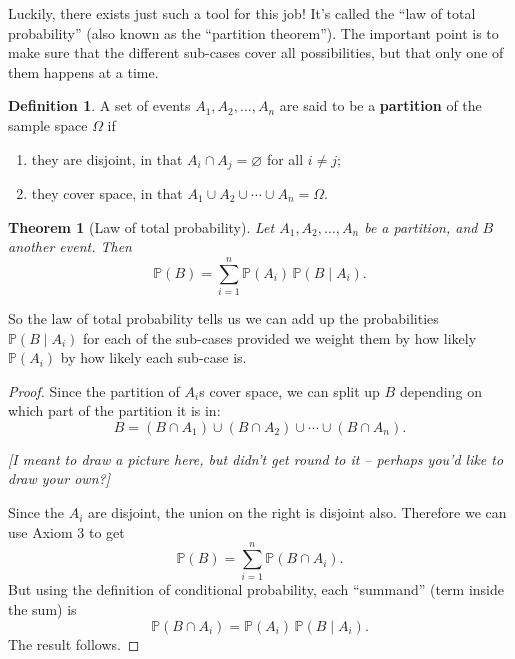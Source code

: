\documentclass[
  a4paper,
]{book}
\providecommand{\tightlist}{%
  \setlength{\itemsep}{0pt}\setlength{\parskip}{0pt}}
\newtheorem{theorem}{Theorem}[chapter]
\theoremstyle{definition}
\newtheorem{definition}{Definition}[chapter]
\theoremstyle{definition}
\theoremstyle{definition}
\theoremstyle{definition}
\theoremstyle{remark}
\begin{document}
Luckily, there exists just such a tool for this job! It's called the ``law of total probability'' (also known as the ``partition theorem''). The important point is to make sure that the different sub-cases cover all possibilities, but that only one of them happens at a time.

\begin{definition}

A set of events \(A_1, A_2, \dots, A_n\) are said to be a \textbf{partition} of the sample space \(\Omega\) if

\begin{enumerate}
\def\labelenumi{\arabic{enumi}.}
\tightlist
\item
  they are disjoint, in that \(A_i \cap A_j = \varnothing\) for all \(i \neq j\);
\item
  they cover space, in that \(A_1 \cup A_2 \cup \cdots \cup A_n = \Omega\).
\end{enumerate}

\end{definition}

\begin{theorem}[Law of total probability]
\protect\hypertarget{thm:thlawtotal}{}\label{thm:thlawtotal}Let \(A_1, A_2, \dots, A_n\) be a partition, and \(B\) another event. Then
\[ \mathbb P(B) = \sum_{i=1}^n \mathbb P(A_i) \, \mathbb P(B \mid A_i) . \]
\end{theorem}

So the law of total probability tells us we can add up the probabilities \(\mathbb P(B \mid A_i)\) for each of the sub-cases provided we weight them by how likely \(\mathbb P(A_i)\) by how likely each sub-case is.

\begin{proof}
Since the partition of \(A_i\)s cover space, we can split up \(B\) depending on which part of the partition it is in:
\[  B = (B \cap A_1) \cup (B \cap A_2) \cup \cdots \cup (B \cap A_n) .  \]

\emph{{[}I meant to draw a picture here, but didn't get round to it -- perhaps you'd like to draw your own?{]}}

Since the \(A_i\) are disjoint, the union on the right is disjoint also.
Therefore we can use Axiom 3 to get
\[ \mathbb P(B) = \sum_{i=1}^n \mathbb P(B \cap A_i) . \]
But using the definition of conditional probability, each ``summand'' (term inside the sum) is
\[ \mathbb P(B \cap A_i) = \mathbb P(A_i) \, \mathbb P(B \mid A_i) . \]
The result follows.
\end{proof}
\end{document}

